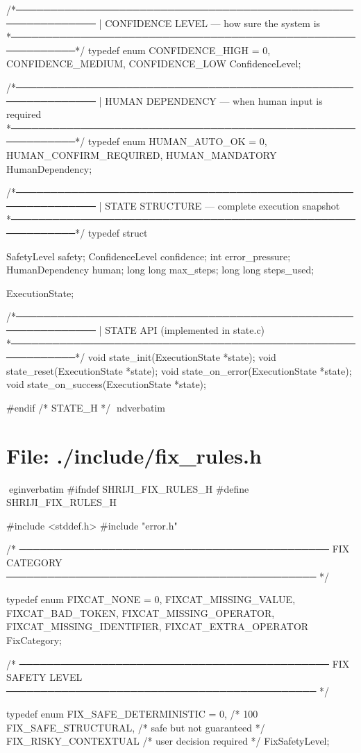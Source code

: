 \documentclass{article}
\begin{document}
/*──────────────────────────────────────────────────────────────
 |  CONFIDENCE LEVEL — how sure the system is
 *────────────────────────────────────────────────────────────*/
typedef enum {
    CONFIDENCE_HIGH = 0,
    CONFIDENCE_MEDIUM,
    CONFIDENCE_LOW
} ConfidenceLevel;


/*──────────────────────────────────────────────────────────────
 |  HUMAN DEPENDENCY — when human input is required
 *────────────────────────────────────────────────────────────*/
typedef enum {
    HUMAN_AUTO_OK = 0,
    HUMAN_CONFIRM_REQUIRED,
    HUMAN_MANDATORY
} HumanDependency;


/*──────────────────────────────────────────────────────────────
 |  STATE STRUCTURE — complete execution snapshot
 *────────────────────────────────────────────────────────────*/
typedef struct {
    SafetyLevel      safety;
    ConfidenceLevel  confidence;
    int              error_pressure;
    HumanDependency  human;
long long max_steps;
long long steps_used;

} ExecutionState;


/*──────────────────────────────────────────────────────────────
 |  STATE API (implemented in state.c)
 *────────────────────────────────────────────────────────────*/
void state_init(ExecutionState *state);
void state_reset(ExecutionState *state);
void state_on_error(ExecutionState *state);
void state_on_success(ExecutionState *state);

#endif /* STATE_H */
nd{verbatim}
\section*{File: ./include/fix_rules.h}
egin{verbatim}
#ifndef SHRIJI_FIX_RULES_H
#define SHRIJI_FIX_RULES_H

#include <stddef.h>
#include "error.h"

/* ─────────────────────────────────────────────
   FIX CATEGORY
───────────────────────────────────────────── */

typedef enum {
    FIXCAT_NONE = 0,
    FIXCAT_MISSING_VALUE,
    FIXCAT_BAD_TOKEN,
    FIXCAT_MISSING_OPERATOR,
    FIXCAT_MISSING_IDENTIFIER,
    FIXCAT_EXTRA_OPERATOR
} FixCategory;

/* ─────────────────────────────────────────────
   FIX SAFETY LEVEL
───────────────────────────────────────────── */

typedef enum {
    FIX_SAFE_DETERMINISTIC = 0,   /* 100%
    FIX_SAFE_STRUCTURAL,          /* safe but not guaranteed */
    FIX_RISKY_CONTEXTUAL          /* user decision required */
} FixSafetyLevel;
\end{document}
